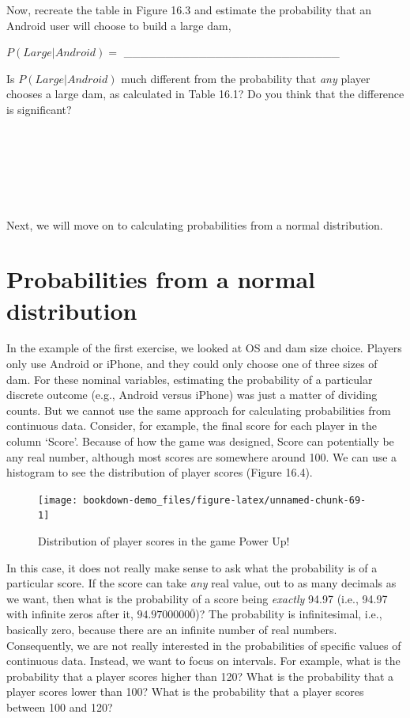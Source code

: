 \documentclass[
]{scrbook}
\begin{document}
Now, recreate the table in Figure 16.3 and estimate the probability that an Android user will choose to build a large dam,

\(P(Large | Android) =\) \_\_\_\_\_\_\_\_\_\_\_\_\_\_\_\_\_\_\_\_\_\_\_\_\_\_

Is \(P(Large | Android)\) much different from the probability that \emph{any} player chooses a large dam, as calculated in Table 16.1? Do you think that the difference is significant?

\begin{verbatim}






\end{verbatim}

Next, we will move on to calculating probabilities from a normal distribution.

\hypertarget{probabilities-from-a-normal-distribution}{%
\section{Probabilities from a normal distribution}\label{probabilities-from-a-normal-distribution}}

In the example of the first exercise, we looked at OS and dam size choice.
Players only use Android or iPhone, and they could only choose one of three sizes of dam.
For these nominal variables, estimating the probability of a particular discrete outcome (e.g., Android versus iPhone) was just a matter of dividing counts.
But we cannot use the same approach for calculating probabilities from continuous data.
Consider, for example, the final score for each player in the column `Score'.
Because of how the game was designed, Score can potentially be any real number, although most scores are somewhere around 100.
We can use a histogram to see the distribution of player scores (Figure 16.4).

\begin{figure}
\texttt{[image: bookdown-demo\_files/figure-latex/unnamed-chunk-69-1]} \caption{Distribution of player scores in the game Power Up!}\label{fig:unnamed-chunk-69}
\end{figure}

In this case, it does not really make sense to ask what the probability is of a particular score.
If the score can take \emph{any} real value, out to as many decimals as we want, then what is the probability of a score being \emph{exactly} 94.97 (i.e., 94.97 with infinite zeros after it, \(94.9700000\bar{0}\))?
The probability is infinitesimal, i.e., basically zero, because there are an infinite number of real numbers.
Consequently, we are not really interested in the probabilities of specific values of continuous data.
Instead, we want to focus on intervals.
For example, what is the probability that a player scores higher than 120?
What is the probability that a player scores lower than 100?
What is the probability that a player scores between 100 and 120?
\end{document}
